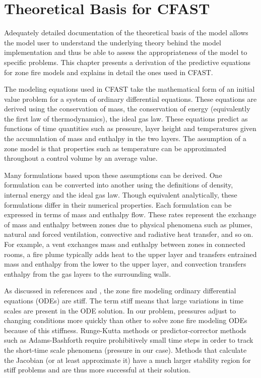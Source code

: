 \chapter{Theoretical Basis for CFAST}
\label{sec:Theory_Chapter}

Adequately detailed documentation of the theoretical basis of the model allows the model user to
understand the underlying theory behind the model implementation and thus be able to assess the
appropriateness of the model to specific problems. This chapter presents a derivation of the
predictive equations for zone fire models and explains in detail the ones used in CFAST.

The modeling equations used in CFAST take the mathematical form of an initial value problem
for a system of ordinary differential equations. These equations are derived using the
conservation of mass, the conservation of energy (equivalently the first law of thermodynamics),
the ideal gas law. These equations predict as functions of time quantities such as pressure, layer
height and temperatures given the accumulation of mass and enthalpy in the two layers. The
assumption of a zone model is that properties such as temperature can be approximated
throughout a control volume by an average value.

Many formulations based upon these assumptions can be derived. One formulation can be
converted into another using the definitions of density, internal energy and the ideal gas law.
Though equivalent analytically, these formulations differ in their numerical properties. Each
formulation can be expressed in terms of mass and enthalpy flow. These rates represent the
exchange of mass and enthalpy between zones due to physical phenomena such as plumes,
natural and forced ventilation, convective and radiative heat transfer, and so on. For example, a
vent exchanges mass and enthalpy between zones in connected rooms, a fire plume typically
adds heat to the upper layer and transfers entrained mass and enthalpy from the lower to the
upper layer, and convection transfers enthalpy from the gas layers to the surrounding walls.

As discussed in references \cite{Forney:1994} and \cite{Rehm:1992}, the zone fire modeling ordinary differential equations (ODEs) are stiff. The term stiff means that large variations in time scales are present in the ODE solution. In our problem, pressures adjust to changing conditions more quickly than other to solve zone fire modeling ODEs because of this stiffness. Runge-Kutta methods or predictor-corrector methods such as Adams-Bashforth require prohibitively small time steps in order to
track the short-time scale phenomena (pressure in our case). Methods that calculate the Jacobian
(or at least approximate it) have a much larger stability region for stiff problems and are thus
more successful at their solution.

